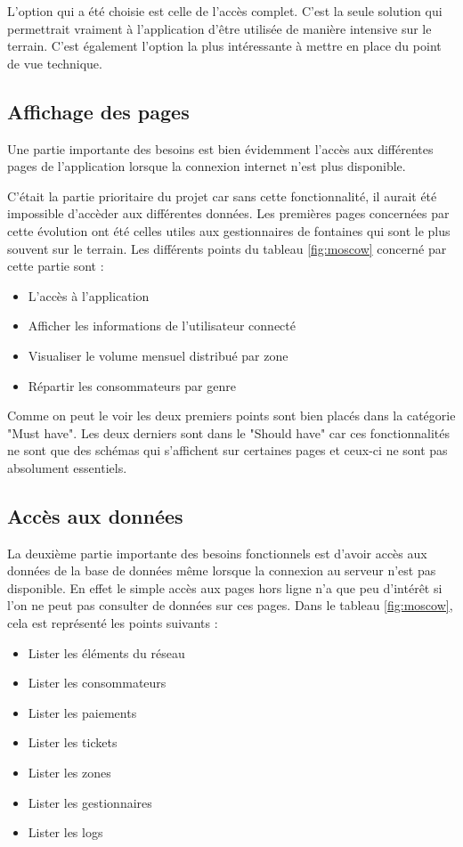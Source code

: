 \documentclass{EPL-master-thesis-covers-FR}
\begin{document}
			L'option qui a été choisie est celle de l'accès complet. C'est la seule solution qui permettrait vraiment à l'application d'être utilisée de manière intensive sur le terrain. C'est également l'option la plus intéressante à mettre en place du point de vue technique.
			
			
			
			\subsection*{Affichage des pages}
				Une partie importante des besoins est bien évidemment l'accès aux différentes pages de l'application lorsque la connexion internet n'est plus disponible. 
				
				C'était la partie prioritaire du projet car sans cette fonctionnalité, il aurait été impossible d'accèder aux différentes données. Les premières pages concernées par cette évolution ont été celles utiles aux gestionnaires de fontaines qui sont le plus souvent sur le terrain.
				Les différents points du tableau \ref{fig:moscow} concerné par cette partie sont :
				\begin{itemize}
					\item L'accès à l'application
					\item Afficher les informations de l'utilisateur connecté
					\item Visualiser le volume mensuel distribué par zone
					\item Répartir les consommateurs par genre
				\end{itemize}
				
				Comme on peut le voir les deux premiers points sont bien placés dans la catégorie "Must have". Les deux derniers sont dans le "Should have" car ces fonctionnalités ne sont que des schémas qui s'affichent sur certaines pages et ceux-ci ne sont pas absolument essentiels.
				
			\subsection*{Accès aux données}
				La deuxième partie importante des besoins fonctionnels est d'avoir accès aux données de la base de données même lorsque la connexion au serveur n'est pas disponible. En effet le simple accès aux pages hors ligne n'a que peu d'intérêt si l'on ne peut pas consulter de données sur ces pages.
			Dans le tableau \ref{fig:moscow}, cela est représenté les points suivants :
				\begin{itemize}
					\item Lister les éléments du réseau
					\item Lister les consommateurs
					\item Lister les paiements
					\item Lister les tickets
					\item Lister les zones
					\item Lister les gestionnaires
					\item Lister les logs
				\end{itemize}
				
\end{document}
